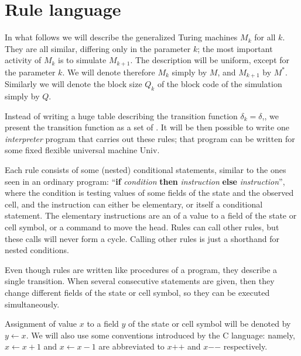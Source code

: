 \documentclass[12pt]{memoir}
\newcommand{\Un}{\mathrm{Univ}}
\newcommand{\increment}[1]{#1\mathord{+}\mathord{+}}
\newcommand{\decrement}[1]{#1\mathord{-}\mathord{-}}
\begin{document}
\section{Rule language}\label{sec:language}

In what follows we will describe the generalized Turing machines \( M_{k} \) for all \( k \).
They are all similar, differing only in the parameter \( k \); the most important activity
of \( M_{k} \) is to simulate \( M_{k+1} \).
The description will be uniform, except for the parameter \( k \).
We will denote therefore \( M_{k} \) simply by \( M \), and \( M_{k+1} \)  by \( M^{*} \).
Similarly we will denote the block size \( Q_{k} \) of the block code of the 
simulation simply by \( Q \).

Instead of writing a huge table describing the transition function \( \delta_{k}=\delta \),,
we present the transition function as a set of .
It will be then possible to write one \emph{interpreter} program that carries
out these rules; that program can be written for some fixed flexible 
universal machine $\Un$.

Each rule consists of some (nested) conditional statements,
similar to the ones seen in an ordinary program:
 ``\textbf{if} \textit{condition} \textbf{then} \textit{instruction}
\textbf{else} \textit{instruction}'', 
where the condition
is testing values of some fields of the state and the observed cell, and
the instruction can either be elementary, or itself a conditional statement. 
The elementary instructions are an  of a value to a field
of the state or cell symbol, or a command to move the head.
Rules can call other rules, but these calls will never form a cycle.
Calling other rules is just a shorthand for nested conditions.

Even though rules are written like procedures of a program,
they describe a single transition.
When several consecutive statements are given, then they
change different fields of the state or
cell symbol, so they can be executed simultaneously.

Assignment of value $x$ to a field $y$ of the state or cell symbol will
be denoted by $y \gets x$.
We will also use some conventions introduced by the C language:
namely,
$x\gets x+1$ and $x\gets x-1$ are abbreviated to $\increment{x}$ and
$\decrement{x}$ respectively.
\end{document}
